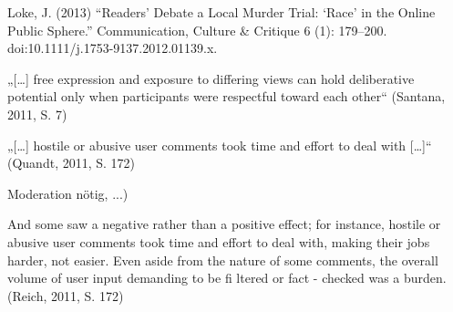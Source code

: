 Loke, J. (2013) “Readers’ Debate a Local Murder Trial: ‘Race’ in the Online
Public Sphere.” Communication, Culture \& Critique 6 (1): 179–200.
doi:10.1111/j.1753-9137.2012.01139.x.




„[\ldots] free expression and exposure to differing views can hold deliberative
potential only when participants were respectful toward each other“ (Santana,
2011, S. 7)




„[\ldots] hostile or abusive user comments took time and effort to deal with
[\ldots]“ (Quandt, 2011, S. 172)




Moderation nötig, ...)


And some saw a negative rather than a positive effect; for instance, hostile or
abusive user comments took time and effort to deal with, making their jobs
harder, not easier. Even aside from the nature of some comments, the overall
volume of user input demanding to be fi ltered or fact - checked was a burden.
(Reich, 2011, S. 172)














